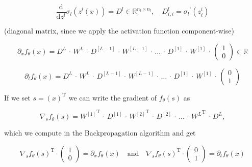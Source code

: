 \begin{equation*}
    \frac{\mathrm{d}}{\mathrm{d} z^{l}} \sigma_{l} (z^{l}(x)) = D^{l} \in \mathbb{R}^{n_l \times n_l}, \quad D_{i, i}^{l} = {\sigma_{l}}^{\prime} (z_{i}^{l})
\end{equation*}

(diagonal matrix, since we apply the activation function component-wise)

\begin{equation*}
    \partial_x f_{\theta}(x) = D^{L} \, \cdot \, W^{L} \, \cdot \, D^{[L-1]} \, \cdot \, W^{[L-1]} \, \cdot \, \ldots \, \cdot \, D^{[1]} \, \cdot \, W^{[1]} \, \cdot \, \begin{pmatrix} 1 \\ 0 \end{pmatrix} \in \mathbb{R}
\end{equation*}

\begin{equation*}
    \partial_t f_{\theta}(x) = D^{L} \, \cdot \, W^{L} \, \cdot \, D^{[L-1]} \, \cdot \, W^{[L-1]} \, \cdot \, \ldots \, \cdot \, D^{[1]} \, \cdot \, W^{[1]} \, \cdot \, \begin{pmatrix} 0 \\ 1 \end{pmatrix} 
\end{equation*}

If we set $s = (x)^{\mathrm{T}}$ we can write the gradient of $f_{\theta}(s)$ as

\begin{equation*}
    \nabla_s f_{\theta}(s) = {W^{[1]}}^{\mathrm{T}} \, \cdot \, D^{[1]} \, \cdot \, {W^{[2]}}^{\mathrm{T}} \, \cdot \, D^{[2]} \, \cdot \, \ldots \, \cdot \, {W^{L}}^{\mathrm{T}} \, \cdot \, D^{L},
\end{equation*}

which we compute in the Backpropagation algorithm and get

\begin{equation*}
    {\nabla_s f_{\theta}(s)}^{\mathrm{T}} \cdot \begin{pmatrix} 1 \\ 0 \end{pmatrix} = \partial_x f_{\theta}(x) \quad \text{and} \quad {\nabla_s f_{\theta}(s)}^{\mathrm{T}} \cdot \begin{pmatrix} 0 \\ 1 \end{pmatrix} = \partial_t f_{\theta}(x)
\end{equation*}


